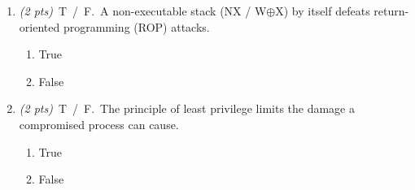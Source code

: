\documentclass[11pt]{article}
\newcommand{\correctchoice}[1]{\ifanswers\textcolor{keygreen}{\textbf{#1}}\else #1\fi}
\newcommand{\wrongchoice}[1]{\ifanswers\textcolor{keygrey}{#1}\else #1\fi}
\newif\ifanswers
\begin{document}
\begin{enumerate}[resume]
\item \textit{(2 pts)}~\textsc{T~/~F.}~A non-executable stack (NX / W$\oplus$X) by itself defeats return-oriented programming (ROP) attacks.
  \begin{enumerate}[label=(\alph*)]
    \item \wrongchoice{True}
    \item \correctchoice{False}
  \end{enumerate}
  \ifanswers \par\smallskip\textcolor{keyred}{\textbf{Answer:} False}
    ROP chains \emph{existing} executable code (gadgets ending in \texttt{ret}), so it needs
    no injected code and sidesteps NX.  ASLR and CFI are the complementary defenses.\par\smallskip\fi

\item \textit{(2 pts)}~\textsc{T~/~F.}~The principle of least privilege limits the damage a compromised process can cause.
  \begin{enumerate}[label=(\alph*)]
    \item \correctchoice{True}
    \item \wrongchoice{False}
  \end{enumerate}
  \ifanswers \par\smallskip\textcolor{keyred}{\textbf{Answer:} True}
    Granting only the privileges a task currently needs shrinks the blast radius when that
    process or account is compromised.\par\smallskip\fi

\end{enumerate}
\end{document}
